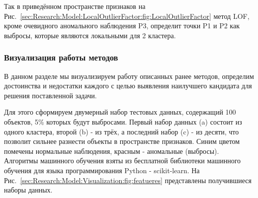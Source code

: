 \documentclass[12pt]{article}
\begin{document}
    \par Так в приведённом пространстве признаков на Рис.~\ref{sec:Research:Model:LocalOutlierFactor:fig:LocalOutlierFactor} метод LOF, кроме очевидного аномального наблюдения P3, определит точки P1 и P2 как выбросы, которые являются локальными для 2 кластера.

    \newpage


    \subsubsection{Визуализация работы методов}
    \label{sec:Research:Model:Visualization}

    \par В данном разделе мы визуализируем работу описанных ранее методов, определим достоинства и недостатки каждого с целью выявления наилучшего кандидата для решения поставленной задачи. \\

    \par Для этого сформируем двумерный набор тестовых данных, содержащий 100 объектов, 5\% которых будут выбросами. Первый набор данных (a) состоит из одного кластера, второй (b) - из трёх, а последний набор (c) - из десяти, что позволит сильнее разнести объекты в пространстве признаков. Синим цветом помечены нормальные наблюдения, красным - аномальные (выбросы). Алгоритмы машинного обучения взяты из бесплатной библиотеки машинного обучения для языка программирования Python - scikit-learn. На Рис.~\ref{sec:Research:Model:Visualization:fig:featueres} представлены получившиеся наборы данных.
\end{document}
